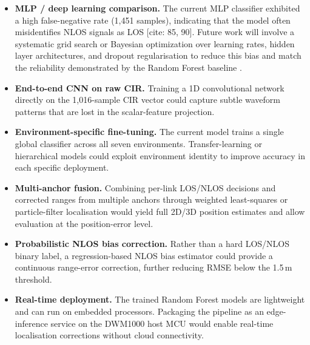 \documentclass[conference]{IEEEtran}
\begin{document}
\begin{itemize}
    \item \textbf{MLP / deep learning comparison.} The current MLP classifier exhibited a high false-negative rate (1,451 samples), indicating that the model often misidentifies NLOS signals as LOS [cite: 85, 90]. Future work will involve a systematic grid search or Bayesian optimization over learning rates, hidden layer architectures, and dropout regularisation to reduce this bias and match the reliability demonstrated by the Random Forest baseline . 
    \item \textbf{End-to-end CNN on raw CIR.} Training a 1D convolutional network
          directly on the 1{,}016-sample CIR vector could capture subtle waveform
          patterns that are lost in the scalar-feature projection.
    \item \textbf{Environment-specific fine-tuning.} The current model trains a single
          global classifier across all seven environments. Transfer-learning or
          hierarchical models could exploit environment identity to improve accuracy in
          each specific deployment.
    \item \textbf{Multi-anchor fusion.} Combining per-link LOS/NLOS decisions and
          corrected ranges from multiple anchors through weighted least-squares or
          particle-filter localisation would yield full 2D/3D position estimates and
          allow evaluation at the position-error level.
    \item \textbf{Probabilistic NLOS bias correction.} Rather than a hard LOS/NLOS
          binary label, a regression-based NLOS bias estimator could provide a
          continuous range-error correction, further reducing RMSE below the
          1.5\,m threshold.
    \item \textbf{Real-time deployment.} The trained Random Forest models are
          lightweight and can run on embedded processors. Packaging the pipeline as an
          edge-inference service on the DWM1000 host MCU would enable real-time
          localisation corrections without cloud connectivity.
\end{itemize}
\end{document}
